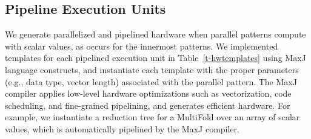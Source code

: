 

\subsection{Pipeline Execution Units}
We generate parallelized and pipelined hardware when parallel patterns compute with scalar values,
as occurs for the innermost patterns.
We implemented templates for each
pipelined execution unit in Table~\ref{t-hwtemplates} using MaxJ language
constructs, and instantiate each template with the proper parameters (e.g., data type,
vector length) associated with the parallel pattern.  The MaxJ compiler
applies low-level hardware optimizations such as vectorization, code
scheduling, and fine-grained pipelining, and generates efficient hardware.  For
example, we instantiate a reduction tree for a MultiFold over an
array of scalar values, which is automatically pipelined by the MaxJ compiler.



